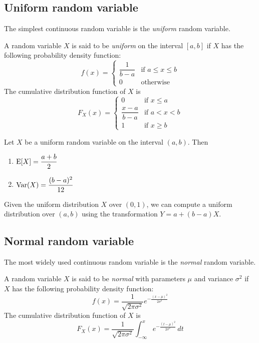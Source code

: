 \documentclass{article}
\begin{document}
\subsection{Uniform random variable}

The simplest continuous random variable is the \emph{uniform} random variable.

\begin{definition}
  A random variable $X$ is said to be \emph{uniform} on the interval $[a, b]$ if $X$ has the following probability density function:
  \[
    f(x) = \begin{cases}
      \dfrac{1}{b - a} & \text{if } a \leq x \leq b \\
      0                & \text{otherwise}
    \end{cases}
  \]
  The cumulative distribution function of $X$ is
  \[
    F_X(x) = \begin{cases}
      0                    & \text{if } x \leq a  \\
      \dfrac{x - a}{b - a} & \text{if } a < x < b \\
      1                    & \text{if } x \geq b
    \end{cases}
  \]
\end{definition}

\begin{proposition}
  Let $X$ be a uniform random variable on the interval $(a, b)$.
  Then
  \begin{enumerate}
    \item $\operatorname{E}[X] = \dfrac{a + b}{2}$
    \item $\operatorname{Var}(X) = \dfrac{(b - a)^2}{12}$
  \end{enumerate}
\end{proposition}

\begin{remark}
  Given the uniform distribution $X$ over $(0, 1)$, we can compute a uniform distribution over $(a, b)$ using the transformation $Y = a + (b - a) X$.
\end{remark}

\subsection{Normal random variable}

The most widely used continuous random variable is the \emph{normal} random variable.

\begin{definition}
  A random variable $X$ is said to be \emph{normal} with parameters $\mu$ and variance $\sigma^2$ if $X$ has the following probability density function:
  \[
    f(x) = \frac{1}{\sqrt{2 \pi \sigma^2}} e^{-\frac{(x - \mu)^2}{2 \sigma^2}}
  \]
  The cumulative distribution function of $X$ is
  \[
    F_X(x) = \frac{1}{\sqrt{2 \pi \sigma^2}} \int_{-\infty}^x e^{-\frac{(t - \mu)^2}{2 \sigma^2}} \, dt
  \]
\end{definition}
\end{document}
